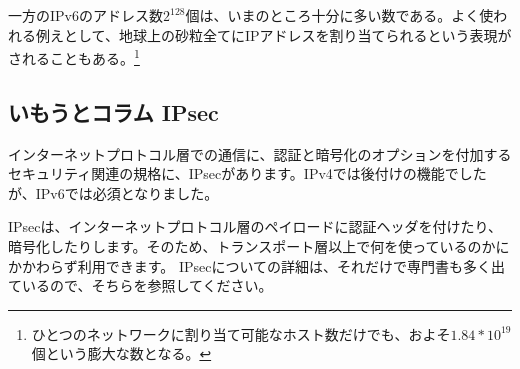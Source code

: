 一方のIPv6のアドレス数$2^{128}$個は、いまのところ十分に多い数である。よく使われる例えとして、地球上の砂粒全てにIPアドレスを割り当てられるという表現がされることもある。\footnote{ひとつのネットワークに割り当て可能なホスト数だけでも、およそ$1.84*10^{19}$個という膨大な数となる。}

\subsection*{いもうとコラム IPsec}
インターネットプロトコル層での通信に、認証と暗号化のオプションを付加するセキュリティ関連の規格に、IPsecがあります。IPv4では後付けの機能でしたが、IPv6では必須となりました。

IPsecは、インターネットプロトコル層のペイロードに認証ヘッダを付けたり、暗号化したりします。そのため、トランスポート層以上で何を使っているのかにかかわらず利用できます。
IPsecについての詳細は、それだけで専門書も多く出ているので、そちらを参照してください。

